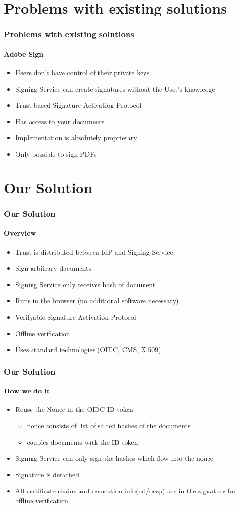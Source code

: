 \section{Problems with existing solutions}
\sectionpage


\begin{frame}[t]\frametitle{Problems with existing solutions}
	\framesubtitle{Adobe Sign}
	\begin{itemize}
	  \item Users don't have control of their private keys
      \item Signing Service can create signatures without the User's knowledge
      \item Trust-based Signature Activation Protocol
      \item Has access to your documents
	  \item Implementation is absolutely proprietary
	  \item Only possible to sign PDFs
	\end{itemize}
\end{frame}


\section{Our Solution}
\sectionpage

\begin{frame}[t]\frametitle{Our Solution}
	\framesubtitle{Overview}
	\begin{itemize}
		\item Trust is distributed between IdP and Signing Service
		\item Sign arbitrary documents
		\item Signing Service only receives hash of document
		\item Runs in the browser (no additional software necessary)
		\item Verifyable Signature Activation Protocol
		\item Offline verification
		\item Uses standard technologies (OIDC, CMS, X.509)
	\end{itemize}
\end{frame}

\begin{frame}[t]\frametitle{Our Solution}
	\framesubtitle{How we do it}
	\begin{itemize}
		\item Reuse the Nonce in the OIDC ID token
		\begin{itemize}
			\item nonce consists of list of salted hashes of the documents
			\item couples documents with the ID token
		\end{itemize}
		\item Signing Service can only sign the hashes which flow into the nonce
		\item Signature is detached
		\item All certificate chains and revocation info(crl/ocsp) are in the signature for offline verification
	\end{itemize}
\end{frame}

